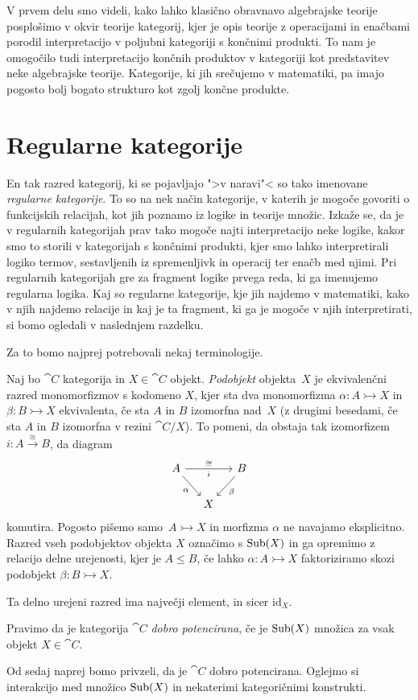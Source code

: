 \documentclass[../kategoricna_logika.tex]{subfiles}
\begin{document}
V prvem delu smo videli, kako lahko klasično obravnavo algebrajske
teorije posplošimo v okvir teorije kategorij, kjer je opis teorije z
operacijami in enačbami porodil interpretacijo v poljubni kategoriji s
končnimi produkti. To nam je omogočilo tudi interpretacijo končnih
produktov v kategoriji kot predstavitev neke algebrajske
teorije. Kategorije, ki jih srečujemo v matematiki, pa imajo pogosto
bolj bogato strukturo kot zgolj končne produkte.
\section{Regularne kategorije}
En tak razred
kategorij, ki se pojavljajo ">v naravi"< so tako imenovane
\emph{regularne kategorije}.  To so na nek način kategorije, v katerih
je mogoče govoriti o funkcijskih relacijah, kot jih poznamo iz logike in teorije
množic.  Izkaže se, da je v regularnih kategorijah prav tako mogoče
najti interpretacijo neke logike, kakor smo to storili v kategorijah s
končnimi produkti, kjer smo lahko interpretirali logiko termov,
sestavljenih iz spremenljivk in operacij ter enačb med njimi.  Pri
regularnih kategorijah gre za fragment logike prvega reda, ki ga
imenujemo regularna logika.  Kaj so regularne kategorije, kje jih
najdemo v matematiki, kako v njih najdemo relacije in kaj je ta
fragment, ki ga je mogoče v njih interpretirati, si bomo ogledali v
naslednjem razdelku.

Za to bomo najprej potrebovali nekaj terminologije.
\begin{definicija}
  Naj bo $\cat{C}$ kategorija in $X \in \cat{C}$ objekt.
  \emph{Podobjekt} objekta~$X$ je ekvivalenčni razred monomorfizmov s
  kodomeno $X$, kjer sta dva monomorfizma
  $\alpha: A \rightarrowtail X$ in $\beta : B \rightarrowtail X$
  ekvivalenta, če sta $A$ in $B$ izomorfna nad~$X$ (z drugimi
  besedami, če sta $A$ in $B$ izomorfna v rezini $\cat{C}/X$).  To pomeni,
  da obstaja tak izomorfizem $i : A \xrightarrow{\cong} B$, da diagram
  \begin{equation*}
    \begin{tikzcd}[column sep=small]
      A \ar[rr, "i"']{a}{\cong} \ar[dr, "\alpha"'] & & B \ar[dl, "\beta"] \\
      & X &
    \end{tikzcd}
  \end{equation*}
  komutira. Pogosto pišemo samo~${A \rightarrowtail X}$ in morfizma
  $\alpha$ ne navajamo eksplicitno.  Razred vseh podobjektov objekta
  $X$ označimo s $\operatorname{Sub}(X)$ in ga opremimo z relacijo delne urejenosti,
  kjer je $A \leq B$, če lahko $\alpha : A \rightarrowtail X$
  faktoriziramo skozi podobjekt $\beta : B \rightarrowtail X$.
\end{definicija}
Ta delno urejeni razred ima največji element, in sicer
$\mathrm{id}_X$.
\begin{definicija}
  Pravimo da je kategorija $\cat{C}$ \emph{dobro potencirana}, če je
  $\operatorname{Sub}(X)$ množica za vsak objekt $X \in \cat{C}$.
\end{definicija}
Od sedaj naprej bomo privzeli, da je $\cat{C}$ dobro potencirana.
Oglejmo si interakcijo med množico $\operatorname{Sub}(X)$ in nekaterimi
kategoričnimi konstrukti.
\end{document}
